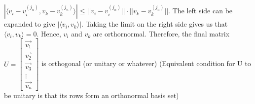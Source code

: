 \documentclass[../Main.tex]{subfiles}
\begin{document}
\\\\ $|\langle v_i-v_i^{(j_n)},v_k-v_k^{(j_n)} \rangle| \leq ||v_i-v_i^{(j_n)} ||\cdot ||v_k-v_k^{(j_n)} ||$. The left side can be expanded to give $|\langle v_i,v_k \rangle|$. Taking the limit on the right side gives us that $\langle v_i,v_k \rangle =0$. Hence, $v_i$ and $v_k$ are orthornormal. Therefore, the final matrix $U=\begin{bmatrix}
    \vec{v_1} \\ \vec{v_2} \\ \vec{v_3} \\ \vdots \\ \vec{v_n}
\end{bmatrix}$ is orthogonal (or unitary or whatever) (Equivalent condition for U to be unitary is that its rows form an orthonormal basis set)
\end{document}
